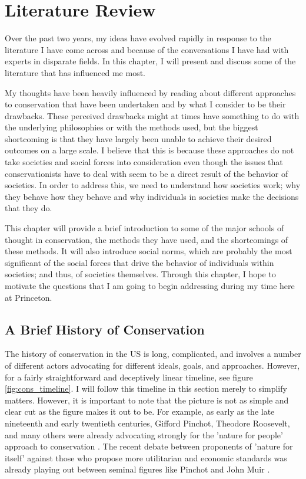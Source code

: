 \documentclass[rutwik_proposal.tex]{subfiles}
\begin{document}
\chapter{Literature Review}\label{ch:litrev}

Over the past two years, my ideas have evolved rapidly in response to the literature I have come across and because of the conversations I have had with experts in disparate fields. In this chapter, I will present and discuss some of the literature that has influenced me most.

My thoughts have been heavily influenced by reading about different approaches to conservation that have been undertaken and by what I consider to be their drawbacks. These perceived drawbacks might at times have something to do with the underlying philosophies or with the methods used, but the biggest shortcoming is that they have largely been unable to achieve their desired outcomes on a large scale. I believe that this is because these approaches do not take societies and social forces into consideration even though the issues that conservationists have to deal with seem to be a direct result of the behavior of societies. In order to address this, we need to understand how societies work; why they behave how they behave and why individuals in societies make the decisions that they do.

This chapter will provide a brief introduction to some of the major schools of thought in conservation, the methods they have used, and the shortcomings of these methods. It will also introduce social norms, which are probably the most significant of the social forces that drive the behavior of individuals within societies; and thus, of societies themselves. Through this chapter, I hope to motivate the questions that I am going to begin addressing during my time here at Princeton.

\section{A Brief History of Conservation}\label{sec:history}

The history of conservation in the US is long, complicated, and involves a number of different actors advocating for different ideals, goals, and approaches. However, for a fairly straightforward and deceptively linear timeline, see figure \ref{fig:cons_timeline}. I will follow this timeline in this section merely to simplify matters. However, it is important to note that the picture is not as simple and clear cut as the figure makes it out to be. For example, as early as the late nineteenth and early twentieth centuries, Gifford Pinchot, Theodore Roosevelt, and many others were already advocating strongly for the 'nature for people' approach to conservation \cite{Pinchot98, Pinchot10, Brinkley09}. The recent debate between proponents of 'nature for itself' against those who propose more utilitarian and economic standards was already playing out between seminal figures like Pinchot and John Muir \cite{Righter05}.
\end{document}
